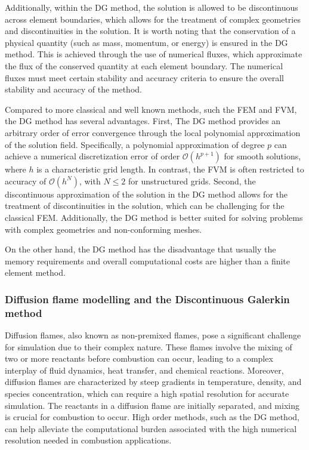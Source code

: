 Additionally, within the DG method, the solution is allowed to be discontinuous across element boundaries, which allows for the treatment of complex geometries and discontinuities in the solution. It is worth noting that the conservation of a physical quantity (such as mass, momentum, or energy)  is ensured  in the DG method. This is achieved through the use of numerical fluxes, which approximate the flux of the conserved quantity at each element boundary. The numerical fluxes must meet certain stability and accuracy criteria to ensure the overall stability and accuracy of the method. 


Compared to more classical and well known methods, such the \gls{FEM} and \gls{FVM}, the DG method has several advantages. First, The DG method provides an arbitrary order of error convergence through the local polynomial approximation of the solution field. Specifically, a polynomial approximation of degree $p$ can achieve a numerical discretization error of order $\mathcal{O}(h^{p+1})$ for smooth solutions, where $h$ is a characteristic grid length. In contrast, the \gls{FVM} is often restricted to accuracy of $\mathcal{O}(h^N)$, with $N \leq 2$ for unstructured grids. Second, the discontinuous approximation of the solution in the DG method allows for the treatment of discontinuities in the solution, which can be challenging for the classical \gls{FEM}. Additionally, the DG method is better suited for solving problems with complex geometries and non-conforming meshes. 

 On the other hand, the DG method has the disadvantage that usually the memory requirements  and overall computational costs are higher than a finite element method.


\subsubsection{Diffusion flame modelling and the Discontinuous Galerkin method}
Diffusion flames, also known as non-premixed flames, pose a significant challenge for simulation due to their complex nature. These flames involve the mixing of two or more reactants before combustion can occur, leading to a complex interplay of fluid dynamics, heat transfer, and chemical reactions. Moreover, diffusion flames are characterized by steep gradients in temperature, density, and species concentration, which can require a high spatial resolution for accurate simulation. The reactants in a diffusion flame are initially separated, and mixing is crucial for combustion to occur. High order methods, such as the DG method, can help alleviate the computational burden associated with the high numerical resolution needed in combustion applications.
 
